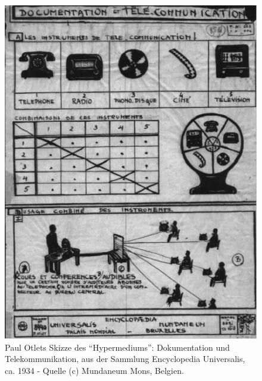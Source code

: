 \begin{figure}[htbp]
\centering
\includegraphics{img/Mundaneum3.jpg}
\caption*{Paul Otlets Skizze des \enquote{Hypermediums}: Dokumentation
und Telekommunikation, aus der Sammlung Encyclopedia Universalis, ca.
1934 - Quelle (c) Mundaneum Mons, Belgien.}
\end{figure}

